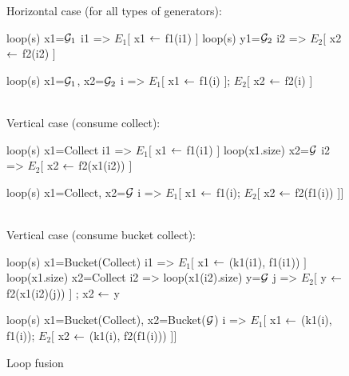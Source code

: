 \begin{figure}
Horizontal case (for all types of generators):
\begin{listing}[aboveskip=7pt]
       loop(s) x1=$\G_1$ { i1 => $E_1[$ x1 $\yield$ f1(i1) $]$ }
       loop(s) y1=$\G_2$ { i2 => $E_2[$ x2 $\yield$ f2(i2) $]$ }
\end{listing}
\vspace{-5pt}{\hspace{6mm}\rule{0.8\columnwidth}{0.25pt}}
\begin{listing}
     loop(s) x1=$\G_1$, x2=$\G_2$ { i => 
              $E_1[$ x1 $\yield$ f1(i) $]$; $E_2[$ x2 $\yield$ f2(i) $]$ }
\end{listing}
~\\[-5pt]
Vertical case (consume collect):
\begin{listing}
      loop(s) x1=Collect { i1 => $E_1[$ x1 $\yield$ f1(i1) $]$ }
    loop(x1.size) x2=$\G$ { i2 => $E_2[$ x2 $\yield$ f2(x1(i2)) $]$ }
\end{listing}
\vspace{-5pt}{\hspace{3mm}\rule{0.9\columnwidth}{0.25pt}}
\begin{listing}
   loop(s) x1=Collect, x2=$\G$ { i => 
                $E_1[$ x1 $\yield$ f1(i); $E_2[$ x2 $\yield$ f2(f1(i)) $]]$ }
\end{listing}
~\\[-5pt]
Vertical case (consume bucket collect):
\begin{listing}
            loop(s) x1=Bucket(Collect) { i1 => 
                $E_1[$ x1 $\yield$ (k1(i1), f1(i1)) $]$ }
      loop(x1.size) x2=Collect { i2 =>  
        loop(x1(i2).size) y=$\G$ { j => 
          $E_2[$ y $\yield$ f2(x1(i2)(j)) $]$ }; x2 $\yield$ y }
\end{listing}
\vspace{-5pt}{\hspace{3mm}\rule{0.85\columnwidth}{0.25pt}}
\begin{listing}
    loop(s) x1=Bucket(Collect), x2=Bucket($\G$) { i => 
        $E_1[$ x1 $\yield$ (k1(i), f1(i));
            $E_2[$ x2 $\yield$ (k1(i), f2(f1(i))) $]]$ }
\end{listing}

\caption{\label{fig-fusion} Loop fusion}
\end{figure}


